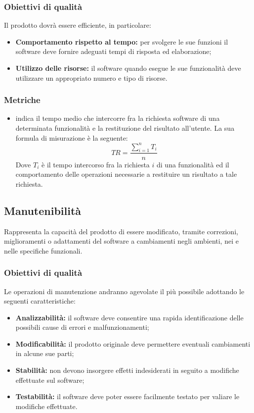 \documentclass[PianoDiQualifica.tex]{subfiles}
\begin{document}
\subsubsection{Obiettivi di qualità}
Il prodotto dovrà essere efficiente, in particolare:
\begin{itemize}
	\item \textbf{Comportamento rispetto al tempo:} per svolgere le sue funzioni il software deve fornire adeguati tempi di risposta ed elaborazione;
	\item \textbf{Utilizzo delle risorse:} il software quando esegue le sue funzionalità deve utilizzare un appropriato numero e tipo di risorse.
\end{itemize}
\subsubsection{Metriche}
\begin{itemize}
	\item {} indica il tempo medio che intercorre fra la richiesta software di una determinata funzionalità e la restituzione del risultato all'utente. La sua formula di misurazione è la seguente: \[TR=\frac{\sum_{i=1}^n T_i}{n}\] Dove $ T_i $ è il tempo intercorso fra la richiesta $ i $ di una funzionalità ed il comportamento delle operazioni necessarie a restituire un risultato a tale richiesta.	
\end{itemize}
\subsection{Manutenibilità}
Rappresenta la capacità del prodotto di essere modificato, tramite correzioni, miglioramenti o adattamenti del software a cambiamenti negli ambienti, nei  e nelle specifiche funzionali.
\subsubsection{Obiettivi di qualità}
Le operazioni di manutenzione andranno agevolate il più possibile adottando le seguenti caratteristiche:
\begin{itemize}
	\item \textbf{Analizzabilità:} il software deve consentire una rapida identificazione delle possibili cause di errori e malfunzionamenti;
	\item \textbf{Modificabilità:} il prodotto originale deve permettere eventuali cambiamenti in alcune sue parti;
	\item \textbf{Stabilità:} non devono insorgere effetti indesiderati in seguito a modifiche effettuate sul software;
	\item \textbf{Testabilità:} il software deve poter essere facilmente testato per valiare le modifiche effettuate.
\end{itemize}
\end{document}
